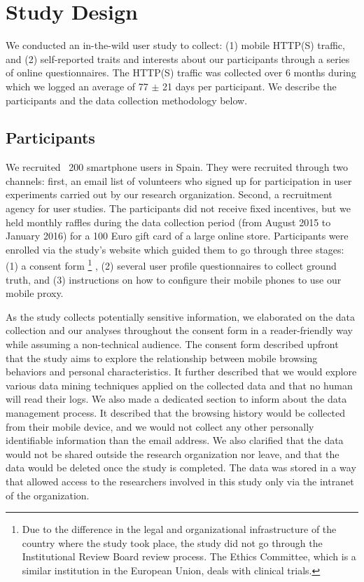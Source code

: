 \section{Study Design}
We conducted an in-the-wild user study to collect: (1) mobile HTTP(S) traffic, and (2) self-reported traits and interests about our participants through a series of online questionnaires. The HTTP(S) traffic was collected over 6 months during which we logged an average of 77 $\pm$ 21 days per participant. We describe the participants and the data collection methodology below.

\subsection{Participants}
We recruited ~200 smartphone users in Spain. They were recruited through two channels: first, an email list of volunteers who signed up for participation in user experiments carried out by our research organization. Second, a recruitment agency for user studies. The participants did not receive fixed incentives, but we held monthly raffles during the data collection period (from August 2015 to January 2016) for a 100 Euro gift card of a large online store. Participants were enrolled via the study's website which guided them to go through three stages: (1) a consent form
\footnote{Due to the difference in the legal and organizational infrastructure of the country where the study took place, the study did not go through the Institutional Review Board review process. The Ethics Committee, which is a similar institution in the European Union, deals with clinical trials.}
, (2) several user profile questionnaires to collect ground truth, and (3) instructions on how to configure their mobile phones to use our mobile proxy. 

As the study collects potentially sensitive information, we elaborated on the data collection and our analyses throughout the consent form in a reader-friendly way while assuming a non-technical audience. The consent form described upfront that the study aims to explore the relationship between mobile browsing behaviors and personal characteristics. It further described that we would explore various data mining techniques applied on the collected data and that no human will read their logs. We also made a dedicated section to inform about the data management process. It described that the browsing history would be collected from their mobile device, and we would not collect any other personally identifiable information than the email address. We also clarified that the data would not be shared outside the research organization nor leave, and that the data would be deleted once the study is completed. The data was stored in a way that allowed access to the researchers involved in this study only via the intranet of the organization.

